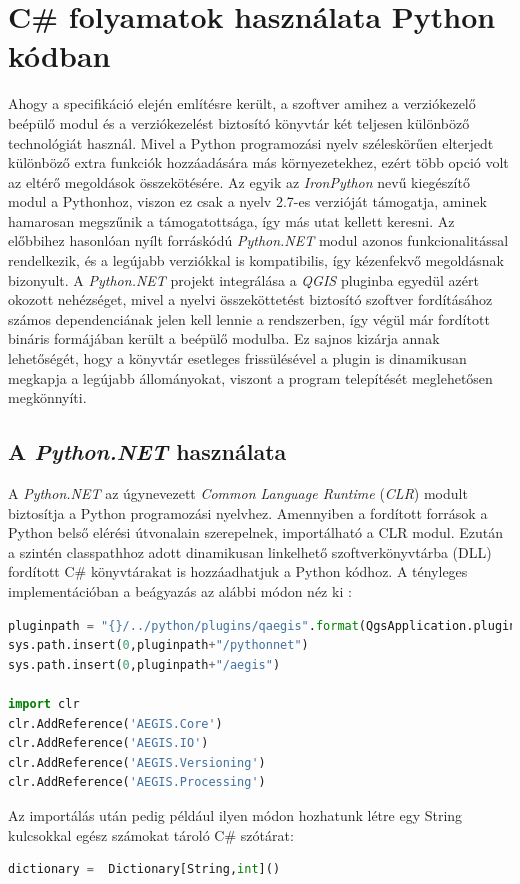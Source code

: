\section{C\# folyamatok használata Python kódban}
Ahogy a specifikáció elején említésre került, a szoftver amihez a verziókezelő beépülő modul és a verziókezelést biztosító könyvtár két teljesen különböző technológiát használ. Mivel a Python programozási nyelv széleskörűen elterjedt különböző extra funkciók hozzáadására más környezetekhez, ezért több opció volt az eltérő megoldások összekötésére. Az egyik az \emph{IronPython} nevű kiegészítő modul a Pythonhoz, viszon ez csak a nyelv 2.7-es verzióját támogatja, aminek hamarosan megszűnik a támogatottsága, így más utat kellett keresni. Az előbbihez hasonlóan nyílt forráskódú \emph{Python.NET} modul azonos funkcionalitással rendelkezik, és a legújabb verziókkal is kompatibilis, így kézenfekvő megoldásnak bizonyult. A \emph{Python.NET} projekt integrálása a \emph{QGIS} pluginba egyedül azért okozott nehézséget, mivel a nyelvi összeköttetést biztosító szoftver fordításához számos dependenciának jelen kell lennie a rendszerben, így végül már fordított bináris formájában került a beépülő modulba. Ez sajnos kizárja annak lehetőségét, hogy a könyvtár esetleges frissülésével a plugin is dinamikusan megkapja a legújabb állományokat, viszont a program telepítését meglehetősen megkönnyíti.
\subsection{A \emph{Python.NET} használata}
A \emph{Python.NET} az úgynevezett \emph{Common Language Runtime} (\emph{CLR}) modult biztosítja a Python programozási nyelvhez. Amennyiben a fordított források a Python belső elérési útvonalain szerepelnek, importálható a CLR modul. Ezután a szintén classpathhoz adott dinamikusan linkelhető szoftverkönyvtárba (DLL) fordított C\# könyvtárakat is hozzáadhatjuk a Python kódhoz. A tényleges implementációban a beágyazás az alábbi módon néz ki :
\begin{lstlisting}[language={python}]
pluginpath = "{}/../python/plugins/qaegis".format(QgsApplication.pluginPath())
sys.path.insert(0,pluginpath+"/pythonnet")
sys.path.insert(0,pluginpath+"/aegis")

import clr
clr.AddReference('AEGIS.Core')
clr.AddReference('AEGIS.IO')
clr.AddReference('AEGIS.Versioning')
clr.AddReference('AEGIS.Processing')
\end{lstlisting}
Az importálás után pedig például ilyen módon hozhatunk létre egy String kulcsokkal egész számokat tároló C\# szótárat:
\begin{lstlisting}[language={python}]
dictionary =  Dictionary[String,int]()
\end{lstlisting}

